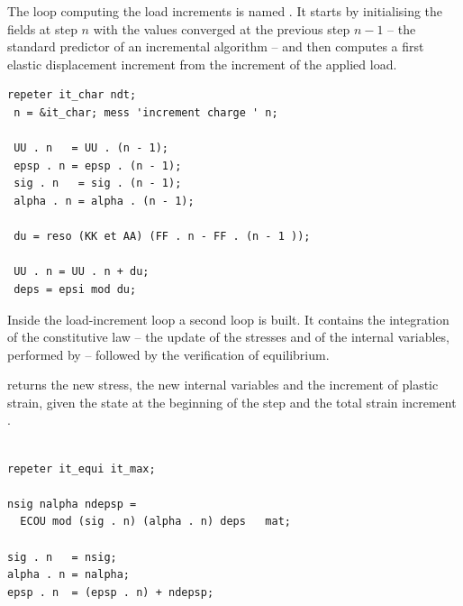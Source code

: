 \begin{castemcom}
The loop computing the load increments is named . It starts by
initialising the fields at step $n$ with the values converged at the previous
step $n-1$ -- the standard predictor of an incremental algorithm -- and then
computes a first elastic displacement increment  from the increment of
the applied load.
\end{castemcom}
\begin{castemlines}
\begin{verbatim}
repeter it_char ndt;
 n = &it_char; mess 'increment charge ' n;
    
 UU . n   = UU . (n - 1);
 epsp . n = epsp . (n - 1);
 sig . n   = sig . (n - 1);
 alpha . n = alpha . (n - 1);
 
 du = reso (KK et AA) (FF . n - FF . (n - 1 )); 
    
 UU . n = UU . n + du;
 deps = epsi mod du;

\end{verbatim}
\end{castemlines}

\pagebreak

\begin{castemcom}
Inside the load-increment loop  a second loop  is
built. It contains the integration of the constitutive law -- the update of
the stresses and of the internal variables, performed by  --
followed by the verification of equilibrium.

 returns the new stress, the new internal variables and the
increment of plastic strain, given the state at the beginning of the step and
the total strain increment .
\end{castemcom}
\begin{castemlines}
\begin{verbatim}
 
repeter it_equi it_max;

nsig nalpha ndepsp = 
  ECOU mod (sig . n) (alpha . n) deps   mat;

sig . n   = nsig;
alpha . n = nalpha;
epsp . n  = (epsp . n) + ndepsp;
  
\end{verbatim}
\end{castemlines}

